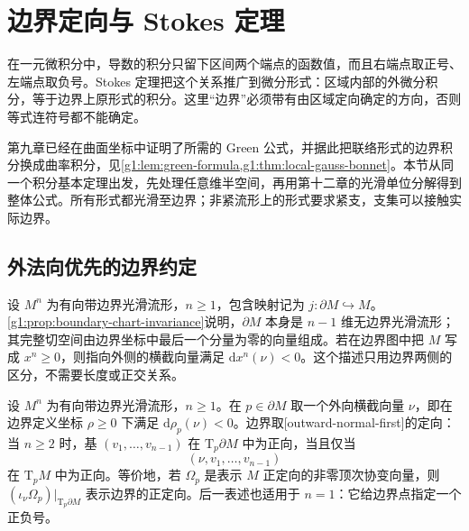 
% 
% 

\section{边界定向与 Stokes 定理}
\label{g1:sec:1404}

在一元微积分中，导数的积分只留下区间两个端点的函数值，而且右端点取正号、左端点取负号。Stokes 定理把这个关系推广到微分形式：区域内部的外微分积分，等于边界上原形式的积分。这里“边界”必须带有由区域定向确定的方向，否则等式连符号都不能确定。

\ProseParagraphBreak

第九章已经在曲面坐标中证明了所需的 Green 公式，并据此把联络形式的边界积分换成曲率积分，见\cref{g1:lem:green-formula,g1:thm:local-gauss-bonnet}。本节从同一个积分基本定理出发，先处理任意维半空间，再用第十二章的光滑单位分解得到整体公式。所有形式都光滑至边界；非紧流形上的形式要求紧支，支集可以接触实际边界。

\subsection{外法向优先的边界约定}
\label{g1:subsec:1404:01}

设 \(M^n\) 为有向带边界光滑流形，\(n\ge1\)，包含映射记为 \(j:\partial M\hookrightarrow M\)。\cref{g1:prop:boundary-chart-invariance}说明，\(\partial M\) 本身是 \(n-1\) 维无边界光滑流形；其完整切空间由边界坐标中最后一个分量为零的向量组成。若在边界图中把 \(M\) 写成 \(x^n\ge0\)，则指向外侧的横截向量满足 \(\mathrm{d}x^n(\nu)<0\)。这个描述只用边界两侧的区分，不需要长度或正交关系。

\begin{definition}\label{g1:def:boundary-orientation}
	设 \(M^n\) 为有向带边界光滑流形，\(n\ge1\)。在 \(p\in\partial M\) 取一个外向横截向量 \(\nu\)，即在边界定义坐标 \(\rho\ge0\) 下满足 \(\mathrm{d}\rho_p(\nu)<0\)。边界取[outward-normal-first]的定向：当 \(n\ge2\) 时，基 \((v_1,\ldots,v_{n-1})\) 在 \(\mathrm{T}_p\partial M\) 中为正向，当且仅当
	\[
		(\nu,v_1,\ldots,v_{n-1})
	\]
	在 \(\mathrm{T}_pM\) 中为正向。等价地，若 \(\Omega_p\) 是表示 \(M\) 正定向的非零顶次协变向量，则 \((\iota_\nu\Omega_p)|_{\mathrm{T}_p\partial M}\) 表示边界的正定向。后一表述也适用于 \(n=1\)：它给边界点指定一个正负号。
\end{definition}

